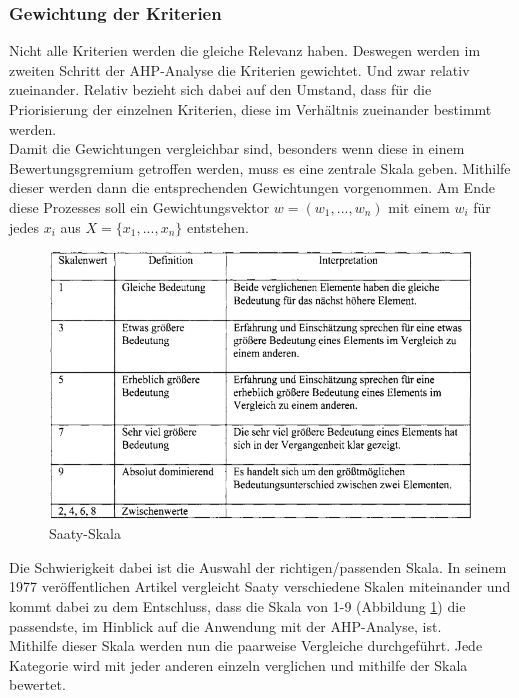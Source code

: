\subsubsection{Gewichtung der Kriterien}
Nicht alle Kriterien werden die gleiche Relevanz haben. Deswegen werden im zweiten Schritt der AHP-Analyse die Kriterien gewichtet.\autocite[Vgl.][S.9]{Mu.2018} Und zwar relativ zueinander. Relativ bezieht sich dabei auf den Umstand, dass für die Priorisierung der einzelnen Kriterien, diese im Verhältnis zueinander bestimmt werden. \\
Damit die Gewichtungen vergleichbar sind, besonders wenn diese in einem Bewertungsgremium getroffen werden, muss es eine zentrale Skala geben. Mithilfe dieser werden dann die entsprechenden Gewichtungen vorgenommen. Am Ende diese Prozesses soll ein Gewichtungsvektor $w=(w_{1}, ..., w_{n})$ mit einem $w_i$ für jedes $x_i$ aus $X=\{x_{1}, ..., x_{n}\}$ entstehen\autocite[Vgl.][S.4]{Brunelli.2015}. \\
\begin{figure}[h!]
	\centering
	\includegraphics[scale = 0.8]{img/Skala.png}
	\caption{Saaty-Skala}
	\label{img:scale}
\end{figure}
Die Schwierigkeit dabei ist die Auswahl der richtigen/passenden Skala. In seinem 1977 veröffentlichen Artikel\autocite{Saaty.1977} vergleicht Saaty verschiedene Skalen miteinander und kommt dabei zu dem Entschluss, dass die Skala von 1-9 (Abbildung \ref{img:scale}) die passendste, im Hinblick auf die Anwendung mit der AHP-Analyse, ist. \\
Mithilfe dieser Skala werden nun die paarweise Vergleiche durchgeführt. Jede Kategorie wird mit jeder anderen einzeln verglichen und mithilfe der Skala bewertet.\autocite[Vgl.][S.106]{Fink.2006}  
